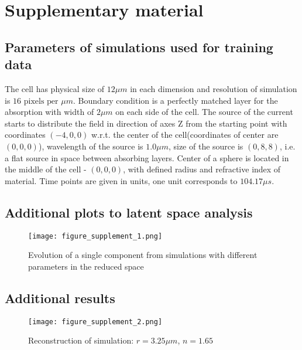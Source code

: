\documentclass[main.tex]{subfiles}
\begin{document}
\section*{Supplementary material}

\subsection*{Parameters of simulations used for training data}\label{sec:params}

The cell has physical size of $12 \mu m$ in each dimension and resolution of simulation is $16 \text{ pixels per } \mu m$. 
Boundary condition is a perfectly matched layer for the absorption with width of $2 \mu m$ on each side of the cell. 
The source of the current starts to distribute the field in direction of axes Z from the starting point with coordinates $(-4,0,0)$ w.r.t. the center of the cell(coordinates of center are $(0,0,0)$), wavelength of the source is $1.0 \mu m$, size of the source is $(0, 8, 8)$, i.e. a flat source in space between absorbing layers. 
Center of a sphere is located in the middle of the cell - $(0,0,0)$, with defined radius and refractive index of material. Time points are given in units, one unit corresponds to $104.17 \mu s$.

\subsection*{Additional plots to latent space analysis}

\begin{figure}[h!]
    \begin{center}
    \texttt{[image: figure\_supplement\_1.png]}
    \caption{Evolution of a single component from simulations with different parameters in the reduced space}
    \label{fig:latan}
    \end{center}
\end{figure}

\subsection*{Additional results}
\begin{figure}[H]
    \begin{center}
    \texttt{[image: figure\_supplement\_2.png]}
    \caption{Reconstruction of simulation: $ r=3.25\mu m$, $ n = 1.65$}
    \label{fig:evol}
    \end{center}
\end{figure}
\end{document}
